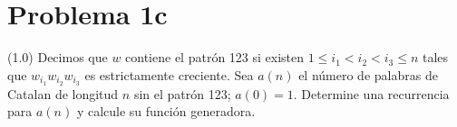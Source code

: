 \section*{Problema 1c}
(1.0) Decimos que $w$ contiene el patrón 123 si existen $1 \le i_1 < i_2 < i_3 \le n$ tales que $w_{i_1} w_{i_2} w_{i_3}$ es estrictamente creciente. Sea $a(n)$ el número de palabras de Catalan de longitud $n$ sin el patrón 123; $a(0)=1$. Determine una recurrencia para $a(n)$ y calcule su función generadora.
